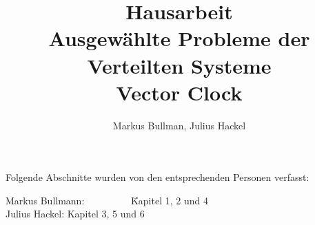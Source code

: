 \documentclass[a4paper]{article}
\author{Markus Bullman, Julius Hackel}
\title{Hausarbeit \\ Ausgewählte Probleme der Verteilten Systeme \\ Vector Clock}
\begin{document}
\maketitle
\tableofcontents
\newpage

Folgende Abschnitte wurden von den entsprechenden Personen verfasst:
\begin{tabbing}
Markus Bullmann:~~~~~~~~~ \= Kapitel 1, 2 und 4 \\
Julius Hackel:        \> Kapitel 3, 5 und 6 \\

\end{tabbing}

\newpage


\cleardoublepage

\cleardoublepage

\cleardoublepage

\cleardoublepage

\cleardoublepage



\newpage
\printbibliography
\end{document}
